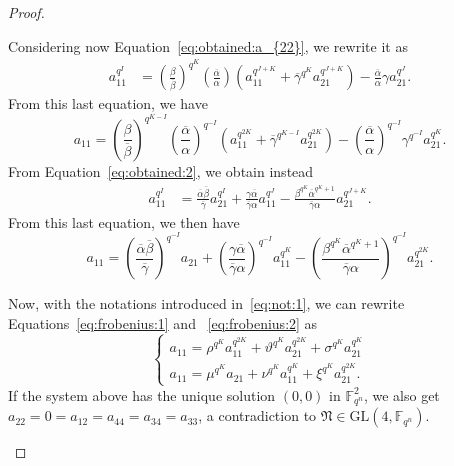 \documentclass[11pt]{article}
\theoremstyle{definition}
\numberwithin{equation}{section}
\begin{document}
\begin{proof}
\begin{enumerate}
Considering now Equation~\eqref{eq:obtained:a_{22}}, we rewrite it as
\begin{equation*}
    \begin{split}
        a_{11}^{q^I} &= \left(\frac{\beta}{\overline{\beta}}\right)^{q^K}\left(\frac{\overline{\alpha}}{\alpha}\right)\left(a_{11}^{q^{J+K}} + \overline{\gamma}^{q^K}a_{21}^{q^{J+K}}\right) - \frac{\overline{\alpha}}{\alpha}\gamma a_{21}^{q^J}.
    \end{split}
\end{equation*}
From this last equation, we have
\begin{equation}
\label{eq:frobenius:1}
           a_{11} = \left(\frac{\beta}{\overline{\beta}}\right)^{q^{K-I}}\left(\frac{\overline{\alpha}}{\alpha}\right)^{q^{-I}}\left(a_{11}^{q^{2K}} + \overline{\gamma}^{q^{K-I}}a_{21}^{q^{2K}}\right) - \left(\frac{\overline{\alpha}}{\alpha}\right)^{q^{-I}}\gamma^{q^{-I}} a_{21}^{q^K}.
\end{equation}
From Equation~\eqref{eq:obtained:2}, we obtain instead
\begin{equation*}
  \begin{split}
 a_{11}^{q^I} &= \frac{\overline{\alpha}\overline{\beta}}{\overline{\gamma}}a_{21}^{q^I} + \frac{\gamma \overline{\alpha}}{\overline{\gamma}\alpha}a_{11}^{q^J} - \frac{\beta^{q^K}\overline{\alpha}^{q^K+1}}{\overline{\gamma}\alpha}a_{21}^{q^{J+K}}.
    \end{split}
\end{equation*}
From this last equation, we then have
\begin{equation}
\label{eq:frobenius:2}
           a_{11} = \left(\frac{\overline{\alpha}\overline{\beta}}{\overline{\gamma}}\right)^{q^{-I}}a_{21} + \left(\frac{\gamma \overline{\alpha}}{\overline{\gamma}\alpha}\right)^{q^{-I}}a_{11}^{q^K} - \left(\frac{\beta^{q^K}\overline{\alpha}^{q^K+1}}{\overline{\gamma}\alpha}\right)^{q^{-I}}a_{21}^{q^{2K}}.
\end{equation}

Now, with the notations introduced in~\eqref{eq:not:1}, we can rewrite Equations~\eqref{eq:frobenius:1} and ~\eqref{eq:frobenius:2} as
\begin{equation}\label{O'Sistemone}
    \begin{cases}
    a_{11} = \rho^{q^K}a_{11}^{q^{2K}} + \vartheta^{q^K}a_{21}^{q^{2K}} + \sigma^{q^K}a_{21}^{q^K}\\
    a_{11} = \mu^{q^K}a_{21} + \nu^{q^K}a_{11}^{q^K} + \xi^{q^K}a_{21}^{q^{2K}}. 
    \end{cases}
\end{equation}
If the system above has the unique solution $(0,0)$ in $\mathbb{F}_{q^n}^2$, we also get $a_{22}=0=a_{12}=a_{44}=a_{34}=a_{33}$, a contradiction to $\mathfrak{N}\in \mathrm{GL}(4,\mathbb{F}_{q^n})$.\qedhere
\end{enumerate} \end{proof}
\end{document}
